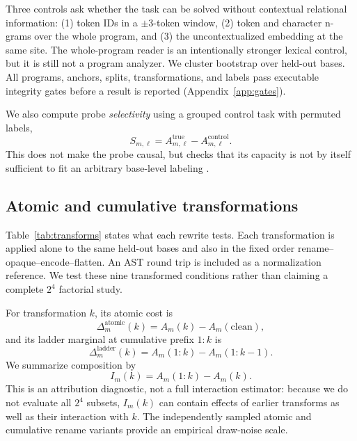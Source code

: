 \documentclass{article}
\begin{document}
Three controls ask whether the task can be solved without contextual relational information: (1) token IDs in a $\pm3$-token window, (2) token and character n-grams over the whole program, and (3) the uncontextualized embedding at the same site. The whole-program reader is an intentionally stronger lexical control, but it is still not a program analyzer. We cluster bootstrap over held-out bases. All programs, anchors, splits, transformations, and labels pass executable integrity gates before a result is reported (Appendix~\ref{app:gates}).

We also compute probe \emph{selectivity} using a grouped control task with
permuted labels,
\begin{equation}
 S_{m,\ell}=A_{m,\ell}^{\mathrm{true}}-
 A_{m,\ell}^{\mathrm{control}}.
 \label{eq:selectivity}
\end{equation}
This does not make the probe causal, but checks that its capacity is not by
itself sufficient to fit an arbitrary base-level labeling
\cite{hewitt2019control}.

\subsection{Atomic and cumulative transformations}
Table~\ref{tab:transforms} states what each rewrite tests. Each transformation is applied alone to the same held-out bases and also in the fixed order rename--opaque--encode--flatten. An AST round trip is included as a normalization reference. We test these nine transformed conditions rather than claiming a complete $2^4$ factorial study.

For transformation $k$, its atomic cost is
\begin{equation}
 \Delta_m^{\mathrm{atomic}}(k)=A_m(k)-A_m(\mathrm{clean}),
 \label{eq:atomic}
\end{equation}
and its ladder marginal at cumulative prefix $1{:}k$ is
\begin{equation}
 \Delta_m^{\mathrm{ladder}}(k)=A_m(1{:}k)-A_m(1{:}k-1).
 \label{eq:ladder}
\end{equation}
We summarize composition by
\begin{equation}
 I_m(k)=A_m(1{:}k)-A_m(k).
 \label{eq:interaction}
\end{equation}
This is an attribution diagnostic, not a full interaction estimator: because
we do not evaluate all $2^4$ subsets, $I_m(k)$ can contain effects of earlier
transforms as well as their interaction with $k$. The independently sampled
atomic and cumulative rename variants provide an empirical draw-noise scale.
\end{document}
